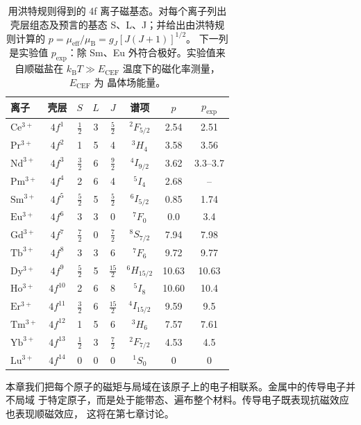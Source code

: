 \begin{table}
\centering
\caption{用洪特规则得到的 4f 离子磁基态。对每个离子列出壳层组态及预言的基态
S、L、J；并给出由洪特规则计算的 $p=\mu_{\mathrm{eff}}/\mu_{\mathrm{B}}=g_J[J(J+1)]^{1/2}$。
下一列是实验值 $p_{\mathrm{exp}}$：除 Sm、Eu 外符合极好。实验值来自顺磁盐在
$k_{\mathrm{B}}T\gg E_{\mathrm{CEF}}$ 温度下的磁化率测量，$E_{\mathrm{CEF}}$ 为
晶体场能量。}
\small
\begin{tabular}{lccccccc}
\toprule
离子 & 壳层 & $S$ & $L$ & $J$ & 谱项 & $p$ & $p_{\mathrm{exp}}$\\
\midrule
$\mathrm{Ce^{3+}}$ & $4f^{1}$ & $\frac{1}{2}$ & 3 & $\frac{5}{2}$ & ${}^{2}F_{5/2}$ & 2.54 & 2.51\\
$\mathrm{Pr^{3+}}$ & $4f^{2}$ & 1 & 5 & 4 & ${}^{3}H_{4}$ & 3.58 & 3.56\\
$\mathrm{Nd^{3+}}$ & $4f^{3}$ & $\frac{3}{2}$ & 6 & $\frac{9}{2}$ & ${}^{4}I_{9/2}$ & 3.62 & 3.3--3.7\\
$\mathrm{Pm^{3+}}$ & $4f^{4}$ & 2 & 6 & 4 & ${}^{5}I_{4}$ & 2.68 & --\\
$\mathrm{Sm^{3+}}$ & $4f^{5}$ & $\frac{5}{2}$ & 5 & $\frac{5}{2}$ & ${}^{6}I_{5/2}$ & 0.85 & 1.74\\
$\mathrm{Eu^{3+}}$ & $4f^{6}$ & 3 & 3 & 0 & ${}^{7}F_{0}$ & 0.0 & 3.4\\
$\mathrm{Gd^{3+}}$ & $4f^{7}$ & $\frac{7}{2}$ & 0 & $\frac{7}{2}$ & ${}^{8}S_{7/2}$ & 7.94 & 7.98\\
$\mathrm{Tb^{3+}}$ & $4f^{8}$ & 3 & 3 & 6 & ${}^{7}F_{6}$ & 9.72 & 9.77\\
$\mathrm{Dy^{3+}}$ & $4f^{9}$ & $\frac{5}{2}$ & 5 & $\frac{15}{2}$ & ${}^{6}H_{15/2}$ & 10.63 & 10.63\\
$\mathrm{Ho^{3+}}$ & $4f^{10}$ & 2 & 6 & 8 & ${}^{5}I_{8}$ & 10.60 & 10.4\\
$\mathrm{Er^{3+}}$ & $4f^{11}$ & $\frac{3}{2}$ & 6 & $\frac{15}{2}$ & ${}^{4}I_{15/2}$ & 9.59 & 9.5\\
$\mathrm{Tm^{3+}}$ & $4f^{12}$ & 1 & 5 & 6 & ${}^{3}H_{6}$ & 7.57 & 7.61\\
$\mathrm{Yb^{3+}}$ & $4f^{13}$ & $\frac{1}{2}$ & 3 & $\frac{7}{2}$ & ${}^{2}F_{7/2}$ & 4.53 & 4.5\\
$\mathrm{Lu^{3+}}$ & $4f^{14}$ & 0 & 0 & 0 & ${}^{1}S_{0}$ & 0 & 0\\
\bottomrule
\end{tabular}
\end{table}

本章我们把每个原子的磁矩与局域在该原子上的电子相联系。金属中的传导电子并不局域
于特定原子，而是处于能带态、遍布整个材料。传导电子既表现抗磁效应也表现顺磁效应，
这将在第七章讨论。

